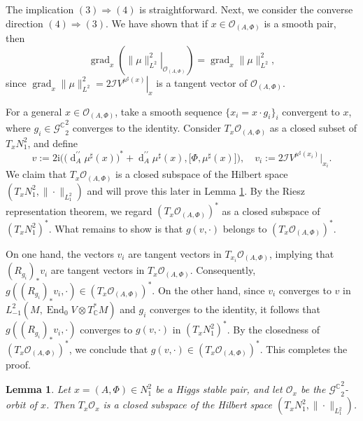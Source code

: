 \documentclass[a4paper]{amsart}
\newtheorem{lemma}[theorem]{Lemma}
\theoremstyle{definition}
\theoremstyle{remark}
\numberwithin{equation}{section}
\begin{document}
The implication $(3) \Rightarrow (4)$ is straightforward. Next, we consider the converse direction $(4) \Rightarrow (3)$. We have shown that if $x \in \mathcal{O}_{(A, \Phi)}$ is a smooth pair, then
\[
\operatorname{grad}_x\left(\left.\|\mu\|_{L^2}^2\right|_{\mathcal{O}_{(A, \Phi)}}\right) = \operatorname{grad}_x \|\mu\|^2_{L^2},
\]
since $\operatorname{grad}_x \|\mu\|^2_{L^2} = \left.2\mathcal{I}V^{\mu^\sharp(x)}\right|_x$ is a tangent vector of $\mathcal{O}_{(A, \Phi)}$. 

For a general $x \in \mathcal{O}_{(A, \Phi)}$, take a smooth sequence $\{x_i = x \cdot g_i\}_i$ convergent to $x$, where $g_i\in {\mathscr{G}^\mathbb{C}}_2^2$ converges to the identity. Consider $T_x \mathcal{O}_{(A, \Phi)}$ as a closed subset of $T_x N_1^2$, and define
\[
v := 2\mathrm{i} \Big( \big( \operatorname{d}_A^{\prime\prime} \mu^\sharp(x) \big)^* + \operatorname{d}_A^{\prime\prime} \mu^\sharp(x), \big[\Phi, \mu^\sharp(x)\big] \Big), \quad v_i := 2 \mathcal{I} V^{\mu^\sharp(x_i)}\Big|_{x_i}.
\]
We claim that $T_x \mathcal{O}_{(A, \Phi)}$ is a closed subspace of the Hilbert space $(T_x N_1^2, \|\cdot\|_{L_1^2})$ and will prove this later in Lemma \ref{closed}. By the Riesz representation theorem, we regard $(T_x \mathcal{O}_{(A, \Phi)})^*$ as a closed subspace of $(T_x N_1^2)^*$. What remains to show is that $g(v, \cdot)$ belongs to $(T_x \mathcal{O}_{(A, \Phi)})^*$.

On one hand, the vectors $v_i$ are tangent vectors in $T_{x_i} \mathcal{O}_{(A, \Phi)}$, implying that $(R_{g_i})_* v_i$ are tangent vectors in $T_x \mathcal{O}_{(A, \Phi)}$. Consequently, $g((R_{g_i})_* v_i, \cdot) \in (T_x \mathcal{O}_{(A, \Phi)})^*$. On the other hand, since $v_i$ converges to $v$ in $L_{-1}^2(M, \operatorname{End}_0 V \otimes T^*_{\mathbb{C}} M)$ and $g_i$ converges to the identity, it follows that $g((R_{g_i})_* v_i, \cdot)$ converges to $g(v, \cdot)$ in $(T_x N_1^2)^*$. By the closedness of $(T_x \mathcal{O}_{(A, \Phi)})^*$, we conclude that $g(v, \cdot) \in (T_x \mathcal{O}_{(A, \Phi)})^*.$ This completes the proof.

\begin{lemma}\label{closed}
Let $x = (A, \Phi) \in N_1^2$ be a Higgs stable pair, and let $\mathcal{O}_x$ be the ${\mathscr{G}^\mathbb{C}}_2^2$-orbit of $x$. Then $T_x \mathcal{O}_x$ is a closed subspace of the Hilbert space $(T_x N_1^2, \|\cdot\|_{L_1^2})$.
\end{lemma}
\end{document}
